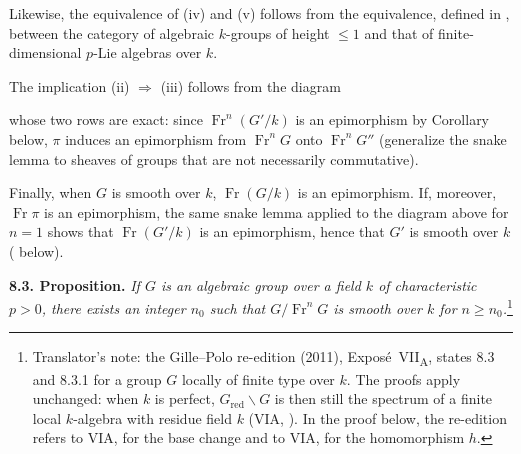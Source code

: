 Likewise, the equivalence of (iv) and (v) follows from the equivalence,
defined in , between the category of algebraic \(k\)-groups of
height \(\leq1\) and that of finite-dimensional \(p\)-Lie algebras over
\(k\).

The implication (ii) \(\Rightarrow\) (iii) follows from the diagram
\begin{center}
  \label{sga3:VIIA:8.2-frobenius-exact-rows-diagram}
  
\end{center}
whose two rows are exact: since \(\operatorname{Fr}^n(G'/k)\) is an
epimorphism by Corollary  below, \(\pi\) induces an epimorphism
from \(\operatorname{Fr}^nG\) onto \(\operatorname{Fr}^nG''\) (generalize
the snake lemma to sheaves of groups that are not necessarily
commutative).

Finally, when \(G\) is smooth over \(k\), \(\operatorname{Fr}(G/k)\) is an
epimorphism. If, moreover, \(\operatorname{Fr}\pi\) is an epimorphism, the
same snake lemma applied to the diagram above for \(n=1\) shows that
\(\operatorname{Fr}(G'/k)\) is an epimorphism, hence that \(G'\) is
smooth over \(k\) ( below).

\medskip
\noindent\textbf{8.3. Proposition.}
\label{sga3:VIIA:8.3}
\textit{If \(G\) is an algebraic group over a field \(k\) of
characteristic \(p>0\), there exists an integer \(n_0\) such that
\(G/\operatorname{Fr}^nG\) is smooth over \(k\) for \(n\ge n_0\).}\footnote{Translator's
note: the Gille--Polo re-edition (2011), Expos\'e~VII\textsubscript{A},
states 8.3 and 8.3.1 for a group \(G\) locally of finite type over \(k\).
The proofs apply unchanged: when \(k\) is perfect,
\(G_{\mathrm{red}}\backslash G\) is then still the spectrum of a finite
local \(k\)-algebra with residue field \(k\) (VIA, ). In the proof
below, the re-edition refers to VIA,  for the base change and to VIA,
 for the homomorphism \(h\).}

